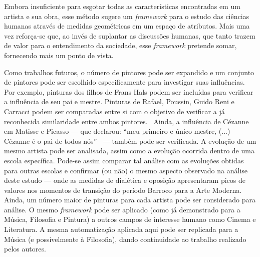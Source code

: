 Embora insuficiente para esgotar todas as características encontradas
em um artista e sua obra, esse método sugere um \textit{framework}
para o estudo das ciências humanas através de medidas geométricas em
um espaço de atributos. Mais uma vez reforça-se que, ao invés de
suplantar as discussões humanas, que tanto trazem de valor para o
entendimento da sociedade, esse \textit{framework} pretende somar,
fornecendo mais um ponto de vista.

Como trabalhos futuros, o número de pintores pode ser expandido e um
conjunto de pintores pode ser escolhido especificamente para
investigar suas influências. Por exemplo, pinturas dos filhos de Frans
Hals podem ser incluídas para verificar a influência de seu pai e
mestre. Pinturas de Rafael, Poussin, Guido Reni e
Carracci podem ser comparadas entre si com o objetivo de verificar a
já reconhecida similaridade entre ambos pintores.~\cite{gombrich} Ainda, a influência
de Cézanne em Matisse e Picasso --- que declarou: ``meu primeiro e
único mestre, (...) Cézanne é o pai de todos nós''~\cite{rishel} ---
também pode ser verificada. A evolução de um mesmo artista pode ser
analisada, assim como a evolução ocorrida dentro de uma escola
específica. Pode-se assim comparar tal análise com as evoluções
obtidas para outras escolas e confirmar (ou não) o mesmo aspecto
observado na análise deste estudo --- onde as medidas de dialética e
oposição apresentaram picos de valores nos momentos de transição do
período Barroco para a Arte Moderna. Ainda, um número maior de
pinturas para cada artista pode ser considerado para análise. O mesmo
\textit{framework} pode ser aplicado (como já demonstrado para a
Música, Filosofia e Pintura) a outros campos de interesse humano como
Cinema e Literatura. A mesma automatização aplicada aqui pode ser
replicada para a Música (e possivelmente à Filosofia), dando
continuidade ao trabalho realizado pelos autores.~\cite{vieira}


